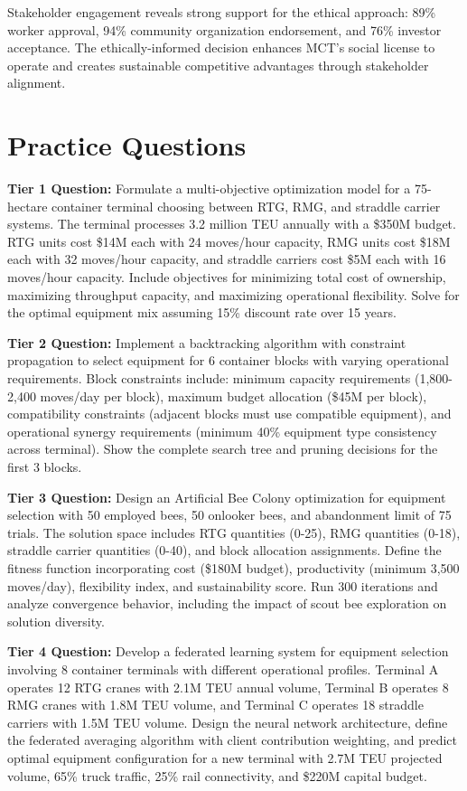 \documentclass{article}
\begin{document}
Stakeholder engagement reveals strong support for the ethical approach: 89\% worker approval, 94\% community organization endorsement, and 76\% investor acceptance. The ethically-informed decision enhances MCT's social license to operate and creates sustainable competitive advantages through stakeholder alignment.

\section{Practice Questions}

\textbf{Tier 1 Question:} Formulate a multi-objective optimization model for a 75-hectare container terminal choosing between RTG, RMG, and straddle carrier systems. The terminal processes 3.2 million TEU annually with a \$350M budget. RTG units cost \$14M each with 24 moves/hour capacity, RMG units cost \$18M each with 32 moves/hour capacity, and straddle carriers cost \$5M each with 16 moves/hour capacity. Include objectives for minimizing total cost of ownership, maximizing throughput capacity, and maximizing operational flexibility. Solve for the optimal equipment mix assuming 15\% discount rate over 15 years.

\textbf{Tier 2 Question:} Implement a backtracking algorithm with constraint propagation to select equipment for 6 container blocks with varying operational requirements. Block constraints include: minimum capacity requirements (1,800-2,400 moves/day per block), maximum budget allocation (\$45M per block), compatibility constraints (adjacent blocks must use compatible equipment), and operational synergy requirements (minimum 40\% equipment type consistency across terminal). Show the complete search tree and pruning decisions for the first 3 blocks.

\textbf{Tier 3 Question:} Design an Artificial Bee Colony optimization for equipment selection with 50 employed bees, 50 onlooker bees, and abandonment limit of 75 trials. The solution space includes RTG quantities (0-25), RMG quantities (0-18), straddle carrier quantities (0-40), and block allocation assignments. Define the fitness function incorporating cost (\$180M budget), productivity (minimum 3,500 moves/day), flexibility index, and sustainability score. Run 300 iterations and analyze convergence behavior, including the impact of scout bee exploration on solution diversity.

\textbf{Tier 4 Question:} Develop a federated learning system for equipment selection involving 8 container terminals with different operational profiles. Terminal A operates 12 RTG cranes with 2.1M TEU annual volume, Terminal B operates 8 RMG cranes with 1.8M TEU volume, and Terminal C operates 18 straddle carriers with 1.5M TEU volume. Design the neural network architecture, define the federated averaging algorithm with client contribution weighting, and predict optimal equipment configuration for a new terminal with 2.7M TEU projected volume, 65\% truck traffic, 25\% rail connectivity, and \$220M capital budget.
\end{document}
